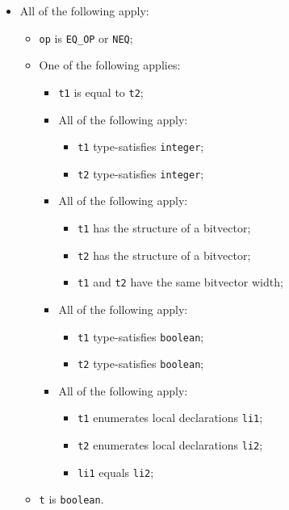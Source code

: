 \documentclass{book}
\begin{document}
\begin{itemize}
  \item All of the following apply:
    \begin{itemize}
    \item \texttt{op} is \texttt{EQ\_OP} or \texttt{NEQ};
    \item One of the following applies:
      \begin{itemize}
      \item \texttt{t1} is equal to \texttt{t2};
      \item All of the following apply:
        \begin{itemize}
        \item \texttt{t1} type-satisfies \texttt{integer};
        \item \texttt{t2} type-satisfies \texttt{integer};
        \end{itemize}
      \item All of the following apply:
        \begin{itemize}
        \item \texttt{t1} has the structure of a bitvector;
        \item \texttt{t2} has the structure of a bitvector;
        \item \texttt{t1} and \texttt{t2} have the same bitvector width;
        \end{itemize}
      \item All of the following apply:
        \begin{itemize}
        \item \texttt{t1} type-satisfies \texttt{boolean};
        \item \texttt{t2} type-satisfies \texttt{boolean};
        \end{itemize}
      \item All of the following apply:
        \begin{itemize}
        \item \texttt{t1} enumerates local declarations \texttt{li1};
        \item \texttt{t2} enumerates local declarations \texttt{li2};
        \item \texttt{li1} equals \texttt{li2};
        \end{itemize}
      \end{itemize}
    \item \texttt{t} is \texttt{boolean}.
    \end{itemize}


\end{itemize}
\end{document}
